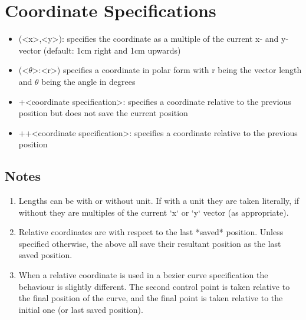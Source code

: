 \documentclass[a4paper,10pt]{article}
\newcommand{\myCode}[1]{\colorbox{gray!30}{#1}}
\begin{document}
\section*{Coordinate Specifications}
\begin{itemize}
    \item \myCode{(<x>,<y>)}: specifies the coordinate as a multiple of the current x- and y-vector (default: 1cm right and 1cm upwards)
    \item \myCode{(<$\theta$>:<r>)} specifies a coordinate in polar form with \myCode{r} being the vector length and \myCode{$\theta$} being the angle in degrees
    \item \myCode{+<coordinate specification>}: specifies a coordinate relative to the previous position but does not save the current position
    \item \myCode{++<coordinate specification>}: specifies a coordinate relative to the previous position
\end{itemize}

\subsection*{Notes}
\begin{enumerate}
    \item Lengths can be with or without unit.  If with a unit they are taken literally, if without they are multiples of the current `x` or `y` vector (as appropriate).
    \item Relative coordinates are with respect to the last *saved* position.  Unless specified otherwise, the above all save their resultant position as the last saved position.
    \item When a relative coordinate is used in a bezier curve specification the behaviour is slightly different.  The second control point is taken relative to the final position of the curve, and the final point is taken relative to the initial one (or last saved position).
\end{enumerate}
\end{document}

